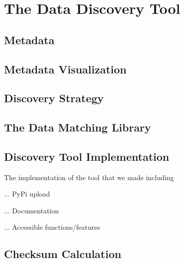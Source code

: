 \chapter{The Data Discovery Tool}\label{ch:ch2label}


\section{Metadata}


\section{Metadata Visualization}



\section{Discovery Strategy}



\section{The Data Matching Library}



\section{Discovery Tool Implementation}
The implementation of the tool that we made including

... PyPi upload

... Documentation

... Accessible functions/features



\section{Checksum Calculation}


